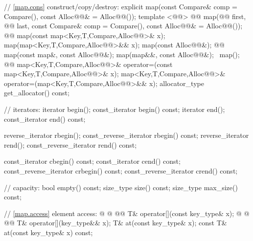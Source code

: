 \documentclass[american,twoside]{book}
\begin{document}
\begin{codeblock}
{{    // \ref{map.cons} construct/copy/destroy:
    explicit map(const Compare& comp = Compare(),
                 const Alloc@@& = Alloc@@());
    template <@@>
      @@
      map(@@ first, @@ last,
          const Compare& comp = Compare(), const Alloc@@& = Alloc@@());
    @@ 
      map(const map<Key,T,Compare,Alloc@@>& x);
    map(map<Key,T,Compare,Alloc@@>&& x);
    map(const Alloc@@&);
    @@ 
      map(const map&, const Alloc@@&);
    map(map&&, const Alloc@@&);
   ~map();
    @@
      map<Key,T,Compare,Alloc@@>& operator=(const map<Key,T,Compare,Alloc@@>& x);
    map<Key,T,Compare,Alloc@@>&
      operator=(map<Key,T,Compare,Alloc@@>&& x);
    allocator_type get_allocator() const;

    // iterators:
    iterator               begin();
    const_iterator         begin() const;
    iterator               end();
    const_iterator         end() const;

    reverse_iterator       rbegin();
    const_reverse_iterator rbegin() const;
    reverse_iterator       rend();
    const_reverse_iterator rend() const;

    const_iterator         cbegin() const;
    const_iterator         cend() const;
    const_reverse_iterator crbegin() const;
    const_reverse_iterator crend() const;

    // capacity:
    bool      empty() const;
    size_type size() const;
    size_type max_size() const;

    // \ref{map.access} element access:
    @ @ 
             @@
      T& operator[](const key_type& x);
    @ @ 
             @@
      T& operator[](key_type&& x);
    T&       at(const key_type& x);
    const T& at(const key_type& x) const;

}}
\end{codeblock}
\end{document}
